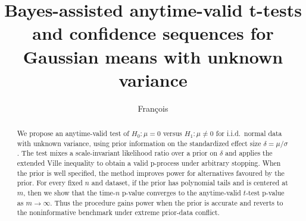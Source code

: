 \documentclass{article}%
\begin{document}
\title{Bayes-assisted anytime-valid t-tests and confidence sequences for Gaussian means with unknown variance}
\author{Fran\c{c}ois}
\maketitle

\begin{abstract}

We propose an anytime-valid test of $H_0:\mu=0$ versus $H_1:\mu\neq 0$ for i.i.d.\ normal data with unknown variance, using prior information on the standardized effect size $\delta=\mu/\sigma$. The test mixes a scale-invariant likelihood ratio over a prior on $\delta$ and applies the extended Ville inequality to obtain a valid p-process under arbitrary stopping. When the prior is well specified, the method improves power for alternatives favoured by the prior. For every fixed $n$ and dataset, if the prior has polynomial tails and is centered at $m$, then we show that the time-$n$ p-value converges to the anytime-valid $t$-test p-value as $m\to\infty$. Thus the procedure gains power when the prior is accurate and reverts to the noninformative benchmark under extreme prior-data conflict.

    
    
\end{abstract}
\end{document}
